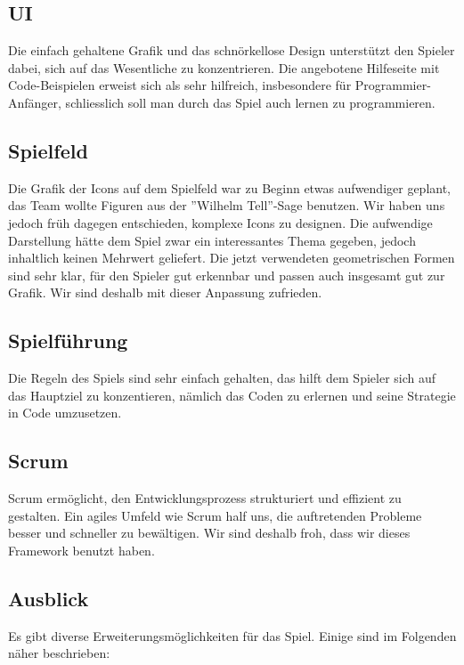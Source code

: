 \documentclass[11pt,a4paper,titlepage]{article}
\begin{document}
\subsection{UI}

Die einfach gehaltene Grafik und das schnörkellose Design unterstützt den Spieler dabei, sich auf das Wesentliche zu konzentrieren.
Die angebotene Hilfeseite mit Code-Beispielen erweist sich als sehr hilfreich, insbesondere für Programmier-Anfänger, schliesslich soll man durch das Spiel auch lernen zu programmieren.

\subsection{Spielfeld}

Die Grafik der Icons auf dem Spielfeld war zu Beginn etwas aufwendiger geplant, das Team wollte Figuren aus der ''Wilhelm Tell''-Sage benutzen. Wir haben uns jedoch früh dagegen entschieden, komplexe Icons zu designen. Die aufwendige Darstellung hätte dem Spiel zwar ein interessantes Thema gegeben, jedoch inhaltlich keinen Mehrwert geliefert. Die jetzt verwendeten geometrischen Formen sind sehr klar, für den Spieler gut erkennbar und passen auch insgesamt gut zur Grafik. Wir sind deshalb mit dieser Anpassung zufrieden.

\subsection{Spielführung}

Die Regeln des Spiels sind sehr einfach gehalten, das hilft dem Spieler sich auf das Hauptziel zu konzentieren, nämlich das Coden zu erlernen und seine Strategie in Code umzusetzen.

\subsection{Scrum}
Scrum ermöglicht, den Entwicklungsprozess strukturiert und effizient zu gestalten. Ein agiles Umfeld wie Scrum half uns, die auftretenden Probleme besser und schneller zu bewältigen. Wir sind deshalb froh, dass wir dieses Framework benutzt haben.

\subsection{Ausblick}

Es gibt diverse Erweiterungsmöglichkeiten für das Spiel. Einige sind im Folgenden näher beschrieben:
\end{document}
